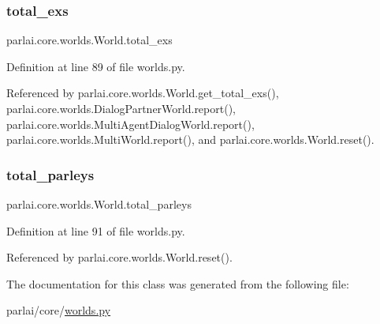 \mbox{\label{classparlai_1_1core_1_1worlds_1_1World_acadde6b5d84d54b912aab56ec38d24dd}} 
\subsubsection{\texorpdfstring{total\+\_\+exs}{total\_exs}}
{\footnotesize\ttfamily parlai.\+core.\+worlds.\+World.\+total\+\_\+exs}



Definition at line 89 of file worlds.\+py.



Referenced by parlai.\+core.\+worlds.\+World.\+get\+\_\+total\+\_\+exs(), parlai.\+core.\+worlds.\+Dialog\+Partner\+World.\+report(), parlai.\+core.\+worlds.\+Multi\+Agent\+Dialog\+World.\+report(), parlai.\+core.\+worlds.\+Multi\+World.\+report(), and parlai.\+core.\+worlds.\+World.\+reset().

\mbox{\label{classparlai_1_1core_1_1worlds_1_1World_ac23951eebe5c495ab2c79e57c960d681}} 
\subsubsection{\texorpdfstring{total\+\_\+parleys}{total\_parleys}}
{\footnotesize\ttfamily parlai.\+core.\+worlds.\+World.\+total\+\_\+parleys}



Definition at line 91 of file worlds.\+py.



Referenced by parlai.\+core.\+worlds.\+World.\+reset().



The documentation for this class was generated from the following file\+:\begin{DoxyCompactItemize}
\item 
parlai/core/\hyperlink{parlai_2core_2worlds_8py}{worlds.\+py}\end{DoxyCompactItemize}
